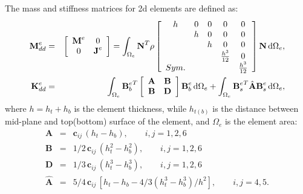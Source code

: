 The mass and stiffness matrices for \ac{2d} elements are defined as:
\begin{eqnarray}
	\textbf{M}_{dd}^e & = &
	\left [
	\begin{array}{cc}
		\textbf{M}^e & 0\\
		0 & \textbf{J}^e
	\end{array}
	\right] =
	\int_{\Omega_e}\textbf{N}^T\rho
	\left [
	\begin{array}{ccccc}
		h & 0 & 0 & 0 & 0 \\
		& h & 0 & 0 & 0 \\
		&  & h & 0 & 0\\
		&  &  & \frac{h^3}{12} & 0\\
		Sym. &  &  &  & \frac{h^3}{12}
	\end{array} \right]
	\textbf{N} \mathop{}\!\mathrm{d}\Omega_e,\\
	\textbf{K}_{dd}^e & = & \int_{\Omega_e}{\textbf{B}_b^e}^T
	\left[
	\begin{array}{cc}
		\textbf{A} & \textbf{B}\\
		\textbf{B} & \textbf{D}
	\end{array} \right]
	\textbf{B}_b^e \mathop{}\!\mathrm{d} \Omega_e+\int_{\Omega_e}{\textbf{B}_s^e}^T\hat{\textbf{A}}\textbf{B}_s^e\mathop{}\!\mathrm{d} \Omega_e,
\end{eqnarray}
where \(h=h_t+h_b\) is the element thickness, while \(h_{t(b)}\) is the distance between mid-plane and top(bottom) surface of the element, and \(\Omega_e\) is the element area:
\begin{eqnarray}
	\textbf{A} & = & \textbf{c}_{ij}\,(h_t-h_b),\qquad i,j=1,2,6\nonumber\\
	\textbf{B} & = & 1/2\, \textbf{c}_{ij}\,(h_t^2-h_b^2),\qquad i,j=1,2,6\nonumber\\
	\textbf{D} & = & 1/3\, \textbf{c}_{ij}\,(h_t^3-h_b^3),\qquad i,j=1,2,6\nonumber\\
	\hat{\textbf{A}} & = & 5/4\, \textbf{c}_{ij}\,\left[h_t-h_b-4/3\left(h_t^3-h_b^3\right)/h^2\right],\qquad i,j=4,5.
\end{eqnarray}
